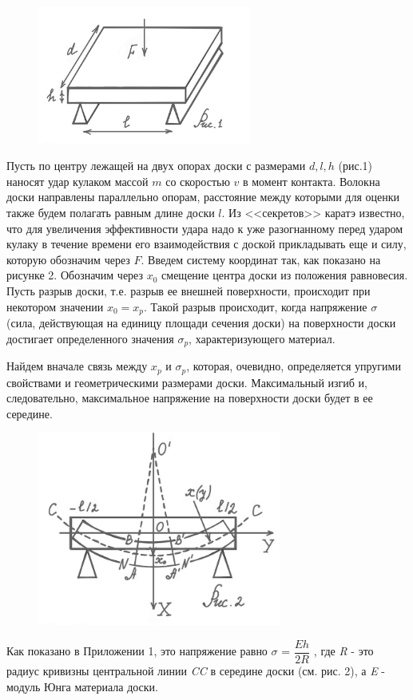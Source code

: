 \documentclass[a4paper,12pt]{article} %
\begin{document}
\newpage
\begin{figure}
\includegraphics[width=7cm]{pictures/1.PNG}
\label{fig:image}
\end{figure}
Пусть по центру лежащей на двух опорах доски с размерами ${d, l, h}$ (рис.1) наносят удар кулаком массой $m$ со скоростью $v$ в момент контакта. Волокна доски направлены параллельно опорам, расстояние между которыми для оценки также будем полагать равным длине доски $l$. Из <<секретов>> каратэ известно, что для увеличения эффективности удара надо к уже разогнанному перед ударом кулаку в течение времени его взаимодействия с доской прикладывать еще и силу, которую обозначим через $F$. Введем систему координат так, как показано на рисунке 2. Обозначим через $x_0$ смещение центра доски из положения равновесия. Пусть разрыв доски, т.е. разрыв ее внешней поверхности, происходит при некотором значении $x_0 = x_p$. Такой разрыв происходит, когда напряжение $\sigma$ (сила, действующая на единицу площади сечения доски) на поверхности доски достигает определенного значения $\sigma_p$, характеризующего материал.

Найдем вначале связь между $x_p$ и $\sigma_p$, которая, очевидно, определяется упругими свойствами и геометрическими размерами доски. Максимальный изгиб и, следовательно, максимальное напряжение на поверхности доски будет в ее середине. \begin{figure}
\includegraphics[width=8cm]{pictures/2.PNG}
\label{fig:image}
\end{figure}
Как показано в Приложении 1, это напряжение равно $\sigma$ = $\dfrac{Eh}{2R}$ , где \textit{R} - это радиус кривизны центральной линии \textit{CC} в середине доски (см. рис. 2), а \textit{E} - модуль Юнга материала доски. 
\end{document}
